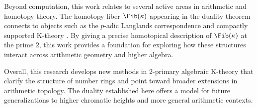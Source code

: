 \documentclass[11pt]{article}
\begin{document}
Beyond computation, this work relates to several active areas in arithmetic and homotopy theory.
The homotopy fiber $\Fib(\kappa)$ appearing in the duality theorem connects to objects such as the $p$-adic Langlands correspondence \cite{MR2905536} and compactly supported K-theory \cite{MR3211458}.
By giving a precise homotopical description of $\Fib(\kappa)$ at the prime $2$, this work provides a foundation for exploring how these structures interact across arithmetic geometry and higher algebra.

Overall, this research develops new methods in $2$-primary algebraic K-theory that clarify the structure of number rings and point toward broader extensions in arithmetic topology.
The duality established here offers a model for future generalizations to higher chromatic heights and more general arithmetic contexts.
\end{document}
